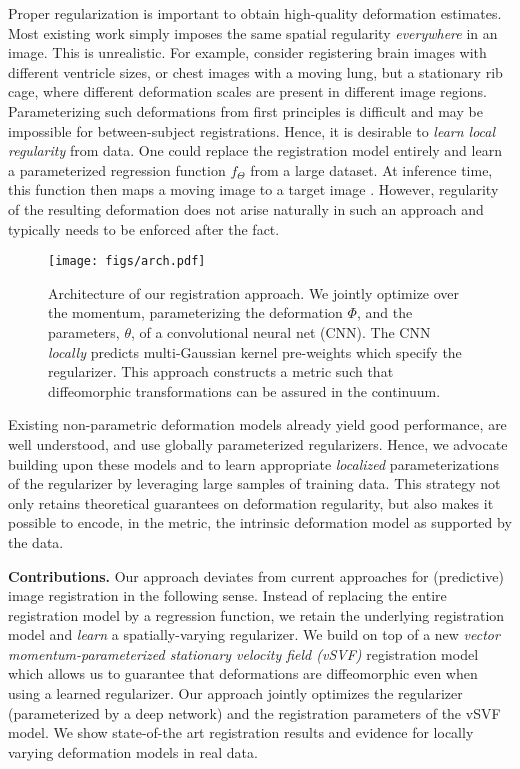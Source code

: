 \documentclass[10pt,twocolumn,letterpaper,table]{article}
\numberwithin{equation}{section}
\theoremstyle{plain}
\theoremstyle{definition}
\begin{document}
Proper regularization is important to obtain high-quality deformation estimates. Most existing work simply imposes the same spatial regularity \emph{everywhere} in an image. This is unrealistic. For example, consider registering brain images with different ventricle sizes, or chest images with a moving lung, but a stationary rib cage, where different deformation scales are present in different image regions. Parameterizing such deformations from first principles is difficult and may be impossible for between-subject registrations. Hence, it is desirable to {\it learn local regularity} from data. One could replace the registration model entirely and learn a parameterized regression function $f_\Theta$ from a large dataset. At inference time, this function then maps a moving image to a target image \cite{de2017end}. However, regularity of the resulting deformation does not arise naturally in such an approach and typically needs to be enforced after the fact.

\begin{figure}[t!]
  \centering
    \texttt{[image: figs/arch.pdf]}
              \caption{Architecture of our registration approach. We jointly optimize over the momentum, parameterizing the deformation $\Phi$, and the parameters, $\theta$, of a convolutional neural net (CNN). The CNN {\it locally} predicts multi-Gaussian kernel pre-weights which specify the regularizer. This approach constructs a metric such that diffeomorphic transformations can be assured in the continuum.} 
    \label{fig:overview}
    \vspace{-0.2cm}
\end{figure}


Existing non-parametric deformation models already yield good performance, are well understood, and use globally parameterized regularizers. Hence, we advocate building upon these models and to learn appropriate \emph{localized} parameterizations of the regularizer by leveraging large samples of training data. This strategy not only retains theoretical guarantees on deformation regularity, but also makes it possible to encode, in the metric, the intrinsic deformation model as supported by the data.



\noindent
    {\bf Contributions.} Our approach deviates from current approaches for (predictive) image registration in the following sense. Instead of replacing the entire registration model by a regression function, we retain the underlying registration model and \emph{learn} a spatially-varying regularizer. We build on top of a new \emph{vector momentum-parameterized stationary velocity field (vSVF)} registration model which allows us to guarantee that deformations are diffeomorphic even when using a learned regularizer. Our approach jointly optimizes the regularizer (parameterized by a deep network) and the registration parameters of the vSVF model. We show state-of-the art registration results and evidence for locally varying deformation models in real data.
\end{document}
